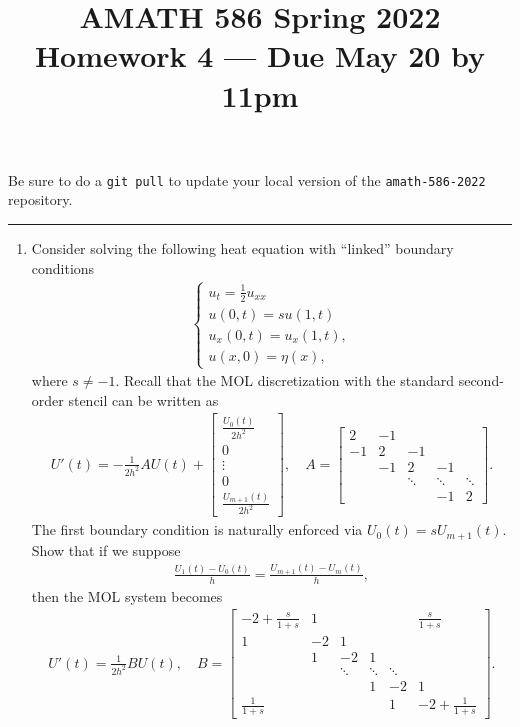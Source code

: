 \documentclass[10pt]{amsart}
\begin{document}
\pagestyle{empty}

\newcommand{\mline}{\vspace{.2in}\hrule\vspace{.2in}}


\title{\bf { AMATH 586 Spring 2022 \\ Homework 4 ---
Due May 20 by 11pm} }
\maketitle
\centerline{Be sure to do a {\tt git pull} to update your local version of the {\tt amath-586-2022} repository.}

\mline
\begin{enumerate}[label={\bf Problem~{\arabic*}:}]
\item Consider solving the following heat equation with ``linked'' boundary conditions
  \begin{align*}
\begin{cases}
u_t = \frac 1 2 u_{xx}\\
u(0,t) = s u(1,t)\\
u_x(0,t) = u_x(1,t),\\
u(x,0) = \eta(x),
\end{cases}
\end{align*}
where $s \neq -1$.   Recall that the MOL discretization with the standard second-order stencil can be written as
\begin{align*}
U'(t) = -\frac{1}{2h^2} A U(t) + \begin{bmatrix} \frac{U_0(t)}{2h^2} \\ 0 \\ \vdots \\ 0 \\ \frac{U_{m+1}(t)}{2h^2} \end{bmatrix}, \quad A = \begin{bmatrix}
2  & -1\\
-1 & 2 & -1 \\
& -1 & 2 & -1\\
&& \ddots & \ddots & \ddots \\
&&& -1 & 2 \end{bmatrix}.
\end{align*}
The first boundary condition is naturally enforced via $U_0(t) = s U_{m+1}(t)$. Show that if we suppose
\begin{align*}
\frac{U_{1}(t) - U_0(t)}{h} = \frac{U_{m+1}(t) - U_m(t)}{h},
\end{align*}
then the MOL system becomes
\begin{align}\label{mol}
U'(t) = \frac{1}{2h^2} B U(t), \quad B = \begin{bmatrix}
-2 + \frac{s}{1 + s} & 1 &&&& \frac{s}{1 + s}\\
1 & -2 & 1 \\
& 1 & -2 & 1 & \\
&&\ddots & \ddots & \ddots \\
&&&1 & -2 & 1 \\
\frac{1}{1+s} &&&& 1 & -2 + \frac{1}{1+s} \end{bmatrix}.
\end{align}


\end{enumerate}
\end{document}
